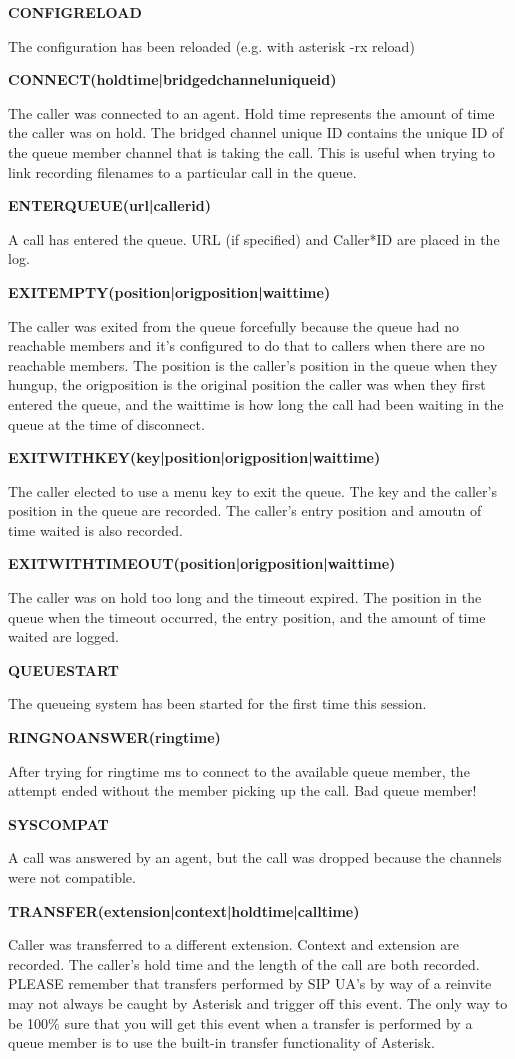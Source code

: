 \textbf{CONFIGRELOAD}

The configuration has been reloaded (e.g. with asterisk -rx reload)

\textbf{CONNECT(holdtime|bridgedchanneluniqueid)}

The caller was connected to an agent.  Hold time represents the amount
of time the caller was on hold. The bridged channel unique ID contains
the unique ID of the queue member channel that is taking the call. This
is useful when trying to link recording filenames to a particular
call in the queue.

\textbf{ENTERQUEUE(url|callerid)}

A call has entered the queue.  URL (if specified) and Caller*ID are placed
in the log.

\textbf{EXITEMPTY(position|origposition|waittime)}

The caller was exited from the queue forcefully because the queue had no
reachable members and it's configured to do that to callers when there
are no reachable members. The position is the caller's position in the
queue when they hungup, the origposition is the original position the 
caller was when they first entered the queue, and the waittime is how 
long the call had been waiting in the queue at the time of disconnect.

\textbf{EXITWITHKEY(key|position|origposition|waittime)}

The caller elected to use a menu key to exit the queue.  The key and
the caller's position in the queue are recorded.  The caller's entry
position and amoutn of time waited is also recorded.

\textbf{EXITWITHTIMEOUT(position|origposition|waittime)}

The caller was on hold too long and the timeout expired.  The position in the
queue when the timeout occurred, the entry position, and the amount of time
waited are logged.

\textbf{QUEUESTART}

The queueing system has been started for the first time this session.

\textbf{RINGNOANSWER(ringtime)}

After trying for ringtime ms to connect to the available queue member,
the attempt ended without the member picking up the call. Bad queue
member!

\textbf{SYSCOMPAT}

A call was answered by an agent, but the call was dropped because the 
channels were not compatible.

\textbf{TRANSFER(extension|context|holdtime|calltime)}

Caller was transferred to a different extension.  Context and extension
are recorded. The caller's hold time and the length of the call are both
recorded. PLEASE remember that transfers performed by SIP UA's by way
of a reinvite may not always be caught by Asterisk and trigger off this
event. The only way to be 100\% sure that you will get this event when
a transfer is performed by a queue member is to use the built-in transfer
functionality of Asterisk.

